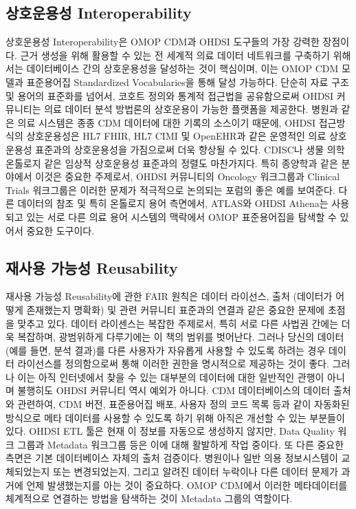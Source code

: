 \documentclass[10.5pt]{book}
\theoremstyle{definition}
\theoremstyle{definition}
\theoremstyle{definition}
\theoremstyle{remark}
\begin{document}
\subsection{상호운용성 Interoperability}\label{-interoperability}

상호운용성 Interoperability은 OMOP CDM과 OHDSI 도구들의 가장 강력한
장점이다. 근거 생성을 위해 활용할 수 있는 전 세계적 의료 데이터
네트워크를 구축하기 위해서는 데이터베이스 간의 상호운용성을 달성하는
것이 핵심이며, 이는 OMOP CDM 모델과 표준용어집 Standardized
Vocabularies을 통해 달성 가능하다. 단순히 자료 구조 및 용어의 표준화를
넘어서, 코호트 정의와 통계적 접근법을 공유함으로써 OHDSI 커뮤니티는 의료
데이터 분석 방법론의 상호운용이 가능한 플랫폼을 제공한다. 병원과 같은
의료 시스템은 종종 CDM 데이터에 대한 기록의 소스이기 때문에, OHDSI
접근방식의 상호운용성은 HL7 FHIR, HL7 CIMI 및 OpenEHR과 같은 운영적인
의료 상호운용성 표준과의 상호운용성을 가짐으로써 더욱 향상될 수 있다.
CDISC나 생물 의학 온톨로지 같은 임상적 상호운용성 표준과의 정렬도
마찬가지다. 특히 종양학과 같은 분야에서 이것은 중요한 주제로서, OHDSI
커뮤니티의 Oncology 워크그룹과 Clinical Trials 워크그룹은 이러한 문제가
적극적으로 논의되는 포럼의 좋은 예를 보여준다. 다른 데이터의 참조 및
특히 온톨로지 용어 측면에서, ATLAS와 OHDSI Athena는 사용되고 있는 서로
다른 의료 용어 시스템의 맥락에서 OMOP 표준용어집을 탐색할 수 있어서
중요한 도구이다.

\subsection{재사용 가능성 Reusability}\label{--reusability}

재사용 가능성 Reusability에 관한 FAIR 원칙은 데이터 라이선스, 출처
(데이터가 어떻게 존재했는지 명확화) 및 관련 커뮤니티 표준과의 연결과
같은 중요한 문제에 초점을 맞추고 있다. 데이터 라이센스는 복잡한
주제로서, 특히 서로 다른 사법권 간에는 더욱 복잡하며, 광범위하게
다루기에는 이 책의 범위를 벗어난다. 그러나 당신의 데이터 (예를 들면,
분석 결과)를 다른 사용자가 자유롭게 사용할 수 있도록 하려는 경우 데이터
라이선스를 정의함으로써 통해 이러한 권한을 명시적으로 제공하는 것이
좋다. 그러나 이는 아직 인터넷에서 찾을 수 있는 대부분의 데이터에 대한
일반적인 관행이 아니며 불행히도 OHDSI 커뮤니티 역시 예외가 아니다. CDM
데이터베이스의 데이터 출처와 관련하여, CDM 버전, 표준용어집 배포, 사용자
정의 코드 목록 등과 같이 자동화된 방식으로 메타 데이터를 사용할 수
있도록 하기 위해 아직은 개선할 수 있는 부분들이 있다. OHDSI ETL 툴은
현재 이 정보를 자동으로 생성하지 않지만, Data Quality 워크 그룹과
Metadata 워크그룹 등은 이에 대해 활발하게 작업 중이다. 또 다른 중요한
측면은 기본 데이터베이스 자체의 출처 검증이다. 병원이나 일반 의용
정보시스템이 교체되었는지 또는 변경되었는지, 그리고 알려진 데이터
누락이나 다른 데이터 문제가 과거에 언제 발생했는지를 아는 것이 중요하다.
OMOP CDM에서 이러한 메타데이터를 체계적으로 연결하는 방법을 탐색하는
것이 Metadata 그룹의 역할이다.
\end{document}
